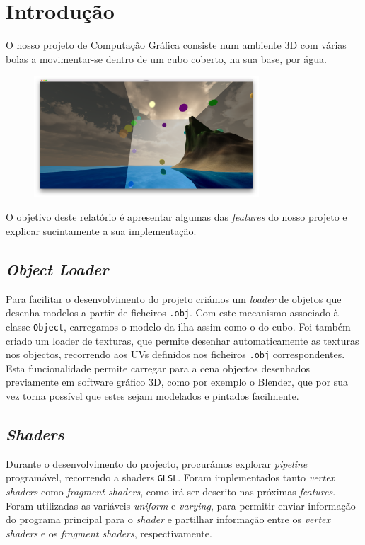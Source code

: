 \documentclass[12pt]{article}
\title{\TitleFont{Computação Gráfica}}
\author{David Gomes (2013136061) \and \vspace{-0.1cm} André Baptista (2012137523)}
\date{}
\begin{document}
\maketitle

\section*{Introdução}
O nosso projeto de Computação Gráfica consiste num ambiente 3D com várias bolas a movimentar-se
dentro de um cubo coberto, na sua base, por água.

\begin{figure}[H]
  \centering
  \includegraphics[width=0.75\textwidth]{screenshot}
\end{figure}

O objetivo deste relatório é apresentar algumas das \textit{features} do nosso projeto e explicar sucintamente a sua implementação.

\pagebreak

\subsection*{\textit{Object Loader}}
Para facilitar o desenvolvimento do projeto criámos um \textit{loader} de objetos que desenha modelos
a partir de ficheiros \texttt{.obj}. Com este mecanismo associado à classe \texttt{Object}, carregamos o modelo da ilha assim como o do cubo. Foi também criado um loader de texturas, que permite desenhar automaticamente as texturas nos objectos, recorrendo aos UVs definidos nos ficheiros \texttt{.obj} correspondentes. Esta funcionalidade permite carregar para a cena objectos desenhados previamente em software gráfico 3D, como por exemplo o Blender, que por sua vez torna possível que estes sejam modelados e pintados facilmente.
\subsection*{\textit{Shaders}}
Durante o desenvolvimento do projecto, procurámos explorar \textit{pipeline} programável, recorrendo a shaders \texttt{GLSL}. Foram implementados tanto \textit{vertex shaders} como \textit{fragment shaders}, como irá ser descrito nas próximas \textit{features}. Foram utilizadas as variáveis \textit{uniform} e \textit{varying}, para permitir enviar informação do programa principal para o \textit{shader} e partilhar informação entre os \textit{vertex shaders} e os \textit{fragment shaders}, respectivamente.
\end{document}
